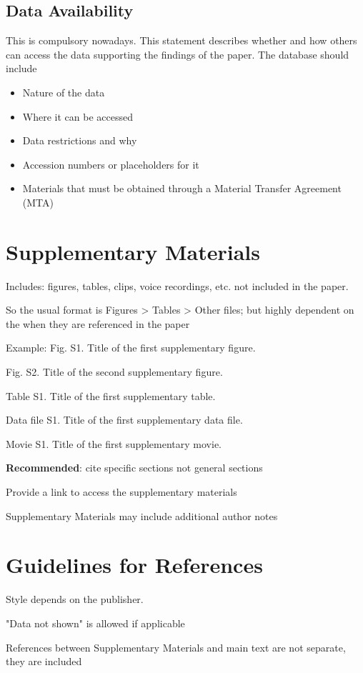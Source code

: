 \documentclass{article}
\begin{document}
	
	\subsection*{Data Availability}
	This is compulsory nowadays. This statement describes whether and how others can access the data supporting the findings of the paper. The database should include
	
	\begin{itemize}
		\item Nature of the data 
		\item Where it can be accessed
		\item Data restrictions and why
		\item Accession numbers or placeholders for it
		\item Materials that must be obtained through a Material Transfer Agreement (MTA)
	\end{itemize}
	
	
	
	\section*{Supplementary Materials}
	Includes: figures, tables, clips, voice recordings, etc. not included in the paper. 
	
	So the usual format is Figures > Tables > Other files; but highly dependent on the when they are referenced in the paper
	
	\medskip Example:
	Fig. S1. Title of the first supplementary figure.
	
	Fig. S2. Title of the second supplementary figure.
	
	Table S1. Title of the first supplementary table.
	
	Data file S1. Title of the first supplementary data file.
	
	Movie S1. Title of the first supplementary movie.
	
	\medskip
	\textbf{Recommended}: cite specific sections not general sections
	
	Provide a link to access the supplementary materials
	
	Supplementary Materials may include additional author notes
	
	\section*{Guidelines for References}
	Style depends on the publisher.
	
	"Data not shown" is allowed if applicable
	
	References between Supplementary Materials and main text are not separate, they are included 
	
	\printbibliography
	

	
\end{document}
